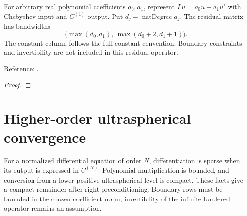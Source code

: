 \begin{supporting}
\begin{theorem}
\label{thm:first-order-ultraspherical}
\leanok
For arbitrary real polynomial coefficients $a_0,a_1$, represent
$Lu=a_0u+a_1u'$ with Chebyshev input and $C^{(1)}$ output. Put
$d_j=\operatorname{natDegree}a_j$. The residual matrix has bandwidths
\[
 \bigl(\max(d_0,d_1),\ \max(d_0+2,d_1+1)\bigr).
\]
The constant column follows the full-constant convention. Boundary constraints
and invertibility are not included in this residual operator.

Reference: \cite[Section 2]{olver-townsend}.
\end{theorem}
\begin{proof}
\leanok
\end{proof}

\end{supporting}

\section{Higher-order ultraspherical convergence}\label{sec:higher-order-ultraspherical}

For a normalized differential equation of order $N$, differentiation is sparse
when its output is expressed in $C^{(N)}$. Polynomial multiplication is bounded,
and conversion from a lower positive ultraspherical level is compact. These
facts give a compact remainder after right preconditioning. Boundary rows must
be bounded in the chosen coefficient norm; invertibility of the infinite
bordered operator remains an assumption.

